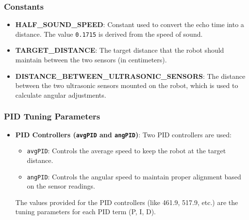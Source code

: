 \documentclass[a4paper,12pt]{article}
\begin{document}
\subsubsection{Constants}
\begin{itemize}
\item \textbf{HALF\_SOUND\_SPEED}: Constant used to convert the echo time into a distance. The value \texttt{0.1715} is derived from the speed of sound.
\item \textbf{TARGET\_DISTANCE}: The target distance that the robot should maintain between the two sensors (in centimeters).
\item \textbf{DISTANCE\_BETWEEN\_ULTRASONIC\_SENSORS}: The distance between the two ultrasonic sensors mounted on the robot, which is used to calculate angular adjustments.
\end{itemize}
\subsubsection{PID Tuning Parameters}
\begin{itemize}
\item \textbf{PID Controllers (\texttt{avgPID} and \texttt{angPID})}: Two PID controllers are used:
\begin{itemize}
\item \texttt{avgPID}: Controls the average speed to keep the robot at the target distance.
\item \texttt{angPID}: Controls the angular speed to maintain proper alignment based on the sensor readings.
\end{itemize}
The values provided for the PID controllers (like 461.9, 517.9, etc.) are the tuning parameters for each PID term (P, I, D).
\end{itemize}
\end{document}
